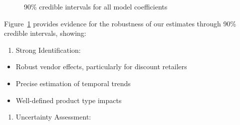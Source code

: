 \documentclass[
  letterpaper,
  DIV=11,
  numbers=noendperiod]{scrartcl}
\providecommand{\tightlist}{%
  \setlength{\itemsep}{0pt}\setlength{\parskip}{0pt}}\usepackage{longtable,booktabs,array}
\begin{document}
\begin{figure}[H]


\caption{\label{fig-intervals}90\% credible intervals for all model
coefficients}

\end{figure}%

Figure~\ref{fig-intervals} provides evidence for the robustness of our
estimates through 90\% credible intervals, showing:

\begin{enumerate}
\def\labelenumi{\arabic{enumi}.}
\tightlist
\item
  Strong Identification:
\end{enumerate}

\begin{itemize}
\tightlist
\item
  Robust vendor effects, particularly for discount retailers
\item
  Precise estimation of temporal trends
\item
  Well-defined product type impacts
\end{itemize}

\begin{enumerate}
\def\labelenumi{\arabic{enumi}.}
\setcounter{enumi}{1}
\tightlist
\item
  Uncertainty Assessment:
\end{enumerate}
\end{document}

